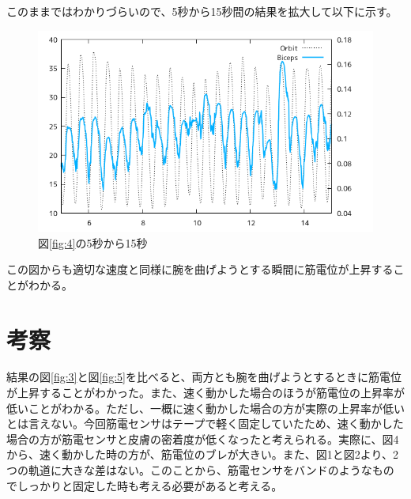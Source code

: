 \documentclass{jsarticle}
\begin{document}
このままではわかりづらいので、5秒から15秒間の結果を拡大して以下に示す。
\begin{figure}[t]
  \begin{center}
    \includegraphics[clip,width=150mm]{Graph_6.png}
    \caption{図\ref{fig:4}の5秒から15秒}
  \end{center}
\end{figure}
この図からも適切な速度と同様に腕を曲げようとする瞬間に筋電位が上昇することがわかる。

\section{考察}
結果の図\ref{fig:3}と図\ref{fig:5}を比べると、両方とも腕を曲げようとするときに筋電位が上昇することがわかった。また、速く動かした場合のほうが筋電位の上昇率が低いことがわかる。ただし、一概に速く動かした場合の方が実際の上昇率が低いとは言えない。今回筋電センサはテープで軽く固定していたため、速く動かした場合の方が筋電センサと皮膚の密着度が低くなったと考えられる。実際に、図4から、速く動かした時の方が、筋電位のブレが大きい。また、図1と図2より、2つの軌道に大きな差はない。このことから、筋電センサをバンドのようなものでしっかりと固定した時も考える必要があると考える。
\end{document}

